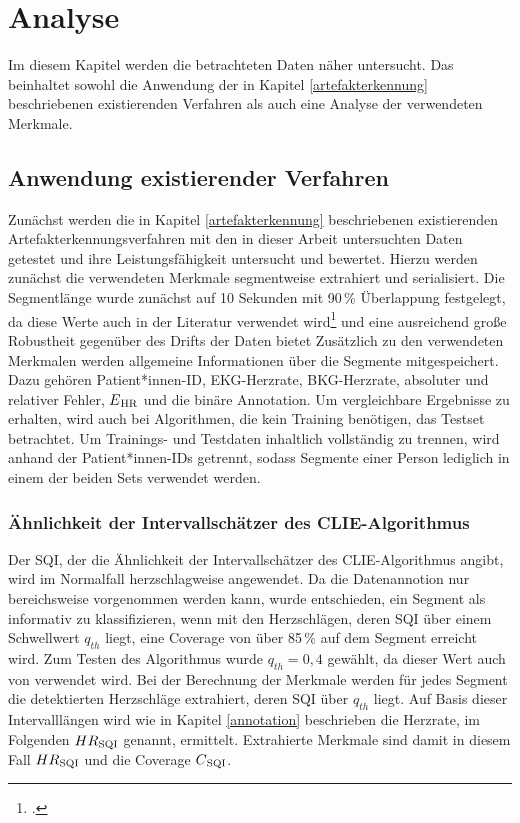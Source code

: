\chapter{Analyse}\label{analyse}

Im diesem Kapitel werden die betrachteten Daten näher untersucht. Das beinhaltet sowohl die Anwendung der in Kapitel \ref{artefakterkennung} beschriebenen existierenden Verfahren als auch eine Analyse der verwendeten Merkmale.


\section{Anwendung existierender Verfahren}

Zunächst werden die in Kapitel \ref{artefakterkennung} beschriebenen existierenden Artefakterkennungsverfahren mit den in dieser Arbeit untersuchten Daten getestet und  ihre Leistungsfähigkeit untersucht und bewertet. Hierzu werden zunächst die verwendeten Merkmale segmentweise extrahiert und serialisiert. Die Segmentlänge wurde zunächst auf 10 Sekunden mit 90\,\% Überlappung festgelegt, da diese Werte auch in der Literatur verwendet wird\footcite[Vgl.][]{Yu2020} und eine ausreichend große Robustheit gegenüber des Drifts der Daten bietet Zusätzlich zu den verwendeten Merkmalen werden allgemeine Informationen über die Segmente mitgespeichert. Dazu gehören Patient*innen-ID, EKG-Herzrate, BKG-Herzrate, absoluter und relativer Fehler, $E\textsubscript{HR}$ und die binäre Annotation. Um vergleichbare Ergebnisse zu erhalten, wird auch bei Algorithmen, die kein Training benötigen, das Testset betrachtet. Um Trainings- und Testdaten inhaltlich vollständig zu trennen, wird anhand der Patient*innen-IDs getrennt, sodass Segmente einer Person lediglich in einem der beiden Sets verwendet werden.

\subsection{Ähnlichkeit der Intervallschätzer des CLIE-Algorithmus}

Der \ac{SQI}, der die Ähnlichkeit der Intervallschätzer des \ac{CLIE}-Algorithmus angibt, wird im Normalfall herzschlagweise angewendet. Da die Datenannotion nur bereichsweise vorgenommen werden kann, wurde entschieden, ein Segment als informativ zu klassifizieren, wenn mit den Herzschlägen, deren \ac{SQI} über einem Schwellwert $q_{th}$ liegt, eine Coverage von über 85\,\% auf dem Segment erreicht wird. Zum Testen des Algorithmus wurde $q_{th} = 0{,}4$ gewählt, da dieser Wert auch von \citeauthor{Zink2017} verwendet wird. Bei der Berechnung der Merkmale werden für jedes Segment die detektierten Herzschläge extrahiert, deren \ac{SQI} über $q_{th}$ liegt. Auf Basis dieser Intervalllängen wird wie in Kapitel \ref{annotation} beschrieben die Herzrate, im Folgenden $HR\textsubscript{SQI}$ genannt, ermittelt. Extrahierte Merkmale sind damit in diesem Fall $HR\textsubscript{SQI}$ und die Coverage $C\textsubscript{SQI}$.

